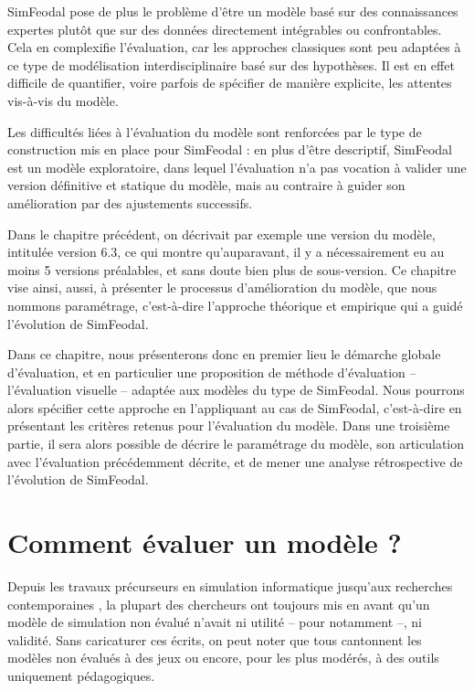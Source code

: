 SimFeodal pose de plus le problème d'être un modèle basé sur des connaissances expertes plutôt que sur des données directement intégrables ou confrontables.
Cela en complexifie l'évaluation, car les approches classiques sont peu adaptées à ce type de modélisation interdisciplinaire basé sur des hypothèses.
Il est en effet difficile de quantifier, voire parfois de spécifier de manière explicite, les attentes vis-à-vis du modèle.

Les difficultés liées à l'évaluation du modèle sont renforcées par le type de construction mis en place pour SimFeodal :
	en plus d'être descriptif, SimFeodal est un modèle exploratoire, dans lequel l'évaluation n'a pas vocation à valider une version définitive et statique du modèle, mais au contraire à guider son amélioration par des ajustements successifs.

Dans le chapitre précédent, on décrivait par exemple une \og version\fg{} du modèle, intitulée \og version 6.3\fg{}, ce qui montre qu'auparavant, il y a nécessairement eu au moins 5 versions préalables, et sans doute bien plus de sous-version.
Ce chapitre vise ainsi, aussi, à présenter le processus d'amélioration du modèle, que nous nommons \og paramétrage\fg{}, c'est-à-dire l'approche théorique et empirique qui a guidé l'évolution de SimFeodal.

Dans ce chapitre, nous présenterons donc en premier lieu le démarche globale d'évaluation, et en particulier une proposition de méthode d'évaluation -- l'évaluation visuelle -- adaptée aux modèles du type de SimFeodal.
Nous pourrons alors spécifier cette approche en l'appliquant au cas de SimFeodal, c'est-à-dire en présentant les critères retenus pour l'évaluation du modèle.
Dans une troisième partie, il sera alors possible de décrire le paramétrage du modèle, son articulation avec l'évaluation précédemment décrite, et de mener une analyse rétrospective de l'évolution de SimFeodal.

\clearpage
\section{Comment évaluer un modèle ?}\label{sec:evaluer-modele}

Depuis les travaux précurseurs en simulation informatique \autocite{naylor_verification_1967,hermann_validation_1967,sargent_validation_1979} jusqu'aux recherches contemporaines \autocite{amblard_evaluation_2006,banos_pour_2013,augusiak_merging_2014, rey-coyrehourcq_plateforme_2015}, la plupart des chercheurs ont toujours mis en avant qu'un modèle de simulation non évalué n'avait ni utilité -- pour \cite{naylor_verification_1967} notamment --, ni validité.
Sans caricaturer ces écrits, on peut noter que tous cantonnent les modèles non évalués à des \og jeux\fg{} ou encore, pour les plus modérés, à des outils uniquement pédagogiques.

